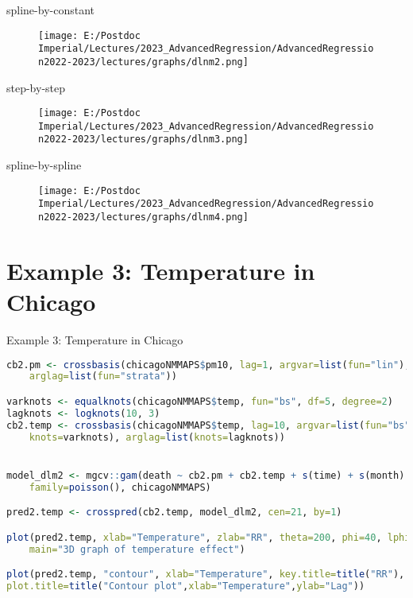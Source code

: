 \documentclass{beamer}
\begin{document}
\begin{frame}[fragile]{spline-by-constant}
	\begin{figure}
		\centering	
		\texttt{[image: E:/Postdoc Imperial/Lectures/2023\_AdvancedRegression/AdvancedRegression2022-2023/lectures/graphs/dlnm2.png]}	
	\end{figure}
\end{frame}

\begin{frame}[fragile]{step-by-step}
	\begin{figure}
		\centering	
		\texttt{[image: E:/Postdoc Imperial/Lectures/2023\_AdvancedRegression/AdvancedRegression2022-2023/lectures/graphs/dlnm3.png]}	
	\end{figure}
\end{frame}

\begin{frame}[fragile]{spline-by-spline}
	\begin{figure}
		\centering	
		\texttt{[image: E:/Postdoc Imperial/Lectures/2023\_AdvancedRegression/AdvancedRegression2022-2023/lectures/graphs/dlnm4.png]}	
	\end{figure}
\end{frame}

\section{Example 3: Temperature in Chicago}

\begin{frame}[fragile]{Example 3: Temperature in Chicago}
	\begin{lstlisting}[language=R, basicstyle=\tiny]
cb2.pm <- crossbasis(chicagoNMMAPS$pm10, lag=1, argvar=list(fun="lin"),
	arglag=list(fun="strata"))

varknots <- equalknots(chicagoNMMAPS$temp, fun="bs", df=5, degree=2)
lagknots <- logknots(10, 3)
cb2.temp <- crossbasis(chicagoNMMAPS$temp, lag=10, argvar=list(fun="bs",
	knots=varknots), arglag=list(knots=lagknots))


model_dlm2 <- mgcv::gam(death ~ cb2.pm + cb2.temp + s(time) + s(month) + dow,
	family=poisson(), chicagoNMMAPS)

pred2.temp <- crosspred(cb2.temp, model_dlm2, cen=21, by=1)

plot(pred2.temp, xlab="Temperature", zlab="RR", theta=200, phi=40, lphi=100,
	main="3D graph of temperature effect")

plot(pred2.temp, "contour", xlab="Temperature", key.title=title("RR"),
plot.title=title("Contour plot",xlab="Temperature",ylab="Lag"))
	\end{lstlisting}
\end{frame}
\end{document}
